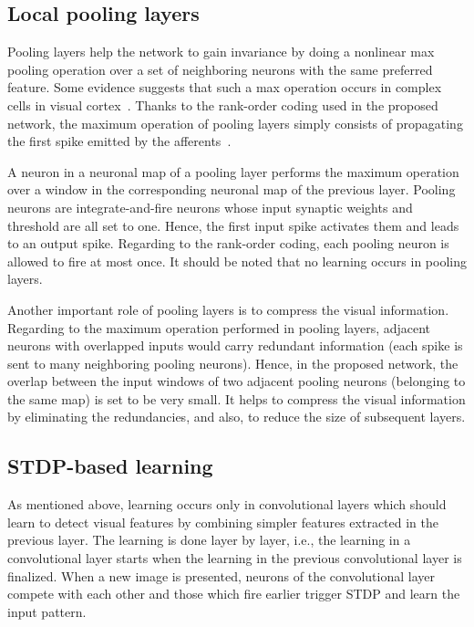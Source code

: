 \documentclass[preprint,5p,12pt,twocolumn]{article}
\begin{document}
\subsection*{Local pooling layers}
Pooling layers help the network to gain invariance by doing a nonlinear max pooling operation over a set of neighboring neurons with the same preferred feature. Some evidence suggests that such a max operation occurs in complex cells in visual cortex~\cite{Serre2007.PAMI}. Thanks to the rank-order coding used in the proposed network, the maximum operation of pooling layers simply consists of propagating the first spike emitted by the afferents~\cite{rousselet2003taking}.

A neuron in a neuronal map of a pooling layer performs the maximum operation over a window in the corresponding neuronal map of the previous layer. Pooling neurons are integrate-and-fire neurons whose input synaptic weights and threshold are all set to one. Hence, the first input spike activates them and leads to an output spike. Regarding to the rank-order coding, each pooling neuron is allowed to fire at most once. It should be noted that no learning occurs in pooling layers. 

Another important role of pooling layers is to compress the visual information. Regarding to the maximum operation performed in pooling layers, adjacent neurons with overlapped inputs would carry redundant information (each spike is sent to many neighboring pooling neurons).  Hence, in the proposed network, the overlap between the input windows of two adjacent pooling neurons (belonging to the same map) is set to be very small. It helps to compress the visual information by eliminating the redundancies, and also, to reduce the size of subsequent layers.


\subsection*{STDP-based learning}
As mentioned above, learning occurs only in convolutional layers which should learn to detect visual features by combining simpler features extracted in the previous layer. The learning is done layer by layer, i.e., the learning in a convolutional layer starts when the learning in the previous convolutional layer is finalized. When a new image is presented, neurons of the convolutional layer compete with each other and those which fire earlier trigger STDP and learn the input pattern.
\end{document}

